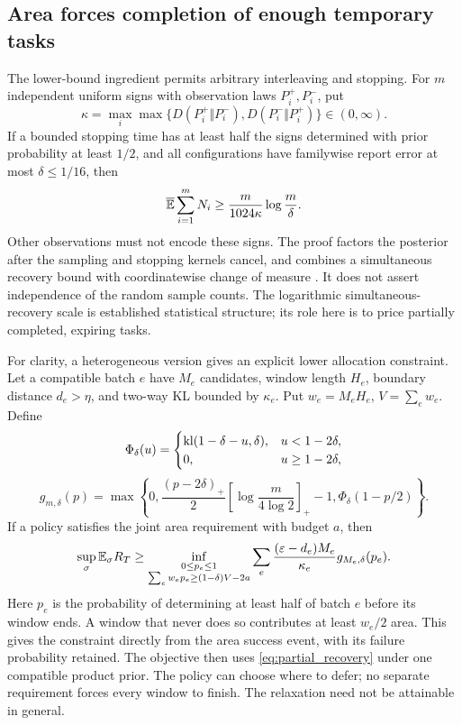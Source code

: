 \documentclass[11pt]{article}
\begin{document}
\subsection{Area forces completion of enough temporary tasks}

The lower-bound ingredient permits arbitrary interleaving and stopping. For
$m$ independent uniform signs with observation laws $P_i^+,P_i^-$, put
\[
 \kappa=\max_i\max\{D(P_i^+\Vert P_i^-),D(P_i^-\Vert P_i^+)\}
                                                    \in(0,\infty).
\]
If a bounded stopping time has at least half the signs determined with prior
probability at least $1/2$, and all configurations have familywise report
error at most $\delta\le1/16$, then
\begin{equation}
 \overline{\mathbb E}\sum_{i=1}^mN_i\ge
                 \frac{m}{1024\kappa}\log\frac m\delta.
 \label{eq:partial_recovery}
\end{equation}
Other observations must not encode these signs. The proof factors the posterior
after the sampling and stopping kernels cancel, and combines a simultaneous
recovery bound with coordinatewise change of measure
\citep{kaufmann2016}. It does not assert independence of the random sample
counts. The logarithmic simultaneous-recovery scale is established statistical
structure; its role here is to price partially completed, expiring tasks.

For clarity, a heterogeneous version gives an explicit lower allocation
constraint. Let a compatible batch $e$ have $M_e$ candidates, window length
$H_e$, boundary distance $d_e>\eta$, and two-way KL bounded by $\kappa_e$.
Put $w_e=M_eH_e$, $V=\sum_ew_e$. Define
\[
 \Phi_\delta(u)=
 \begin{cases}\operatorname{kl}(1-\delta-u,\delta),&u<1-2\delta,\\0,&u\ge1-2\delta,
 \end{cases}
\]
\[
 g_{m,\delta}(p)=\max\left\{0,
 \frac{(p-2\delta)_+}{2}\left[\log\frac m{4\log2}\right]_+-1,
 \Phi_\delta(1-p/2)\right\}.
\]
If a policy satisfies the joint area requirement with budget $a$, then
\begin{equation}
 \sup_\sigma\mathbb E_\sigma R_T\ge
 \inf_{\substack{0\le p_e\le1\\\sum_ew_ep_e\ge(1-\delta)V-2a}}
 \sum_e\frac{(\varepsilon-d_e)M_e}{\kappa_e}g_{M_e,\delta}(p_e).
 \label{eq:allocation_lower}
\end{equation}
Here $p_e$ is the probability of determining at least half of batch $e$ before
its window ends. A window that never does so contributes at least $w_e/2$
area. This gives the constraint directly from the area success event, with its
failure probability retained. The objective then uses
\eqref{eq:partial_recovery} under one compatible product prior. The policy can
choose where to defer; no separate requirement forces every window to finish.
The relaxation need not be attainable in general.
\end{document}
